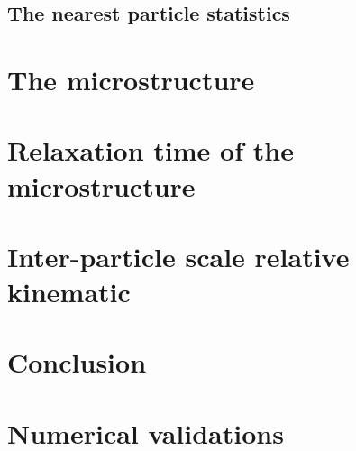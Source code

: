 \documentclass[11pt]{My_preprint}
\begin{document}







\subsection{The nearest particle statistics}




\section{The microstructure}
\label{sec:microstructure}



\section{Relaxation time of the microstructure}
\label{sec:time}



\section{Inter-particle scale relative kinematic}
\label{sec:velocity}


% 

\section{Conclusion}


\appendix
\section{Numerical validations}
\label{ap:validation}

% 




\end{document}
